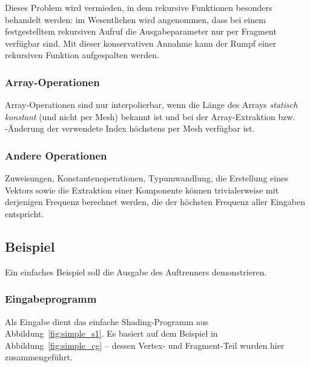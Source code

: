 \documentclass[twoside,a4paper,fleqn,12pt]{book}
\begin{document}
Dieses Problem wird vermieden, in dem rekursive Funktionen besonders behandelt werden: im Wesentlichen wird angenommen,
dass bei einem festgestelltem rekursiven Aufruf die Ausgabeparameter nur per Fragment verfügbar sind.
Mit dieser konservativen Annahme kann der Rumpf einer rekursiven Funktion aufgespalten werden.



% 

\subsubsection{Array-Operationen}

Array-Operationen sind nur interpolierbar, wenn die Länge des Arrays \emph{statisch konstant}
(und nicht per Mesh) bekannt ist und bei der Array-Extraktion bzw. \mbox{-Än}\-de\-rung der verwendete Index höchstens per Mesh
verfügbar ist.

\subsubsection{Andere Operationen}

Zuweisungen, Konstantenoperationen, Typumwandlung, die Erstellung eines Vektors sowie
die Extraktion einer Komponente können trivialerweise mit derjenigen Frequenz berechnet werden, die der höchsten Frequenz
aller Eingaben entspricht.

\subsection{Beispiel}

Ein einfaches Beispiel soll die Ausgabe des Auftrenners demonstrieren.

\subsubsection{Eingabeprogramm}

Als Eingabe dient das einfache Shading-Programm aus Abbildung~\ref{fig:simple_s1}.
Es basiert auf dem Beispiel in Abbildung~\ref{fig:simple_cg} -- dessen Vertex- und Fragment-Teil wurden hier zusammengeführt.
\end{document}
